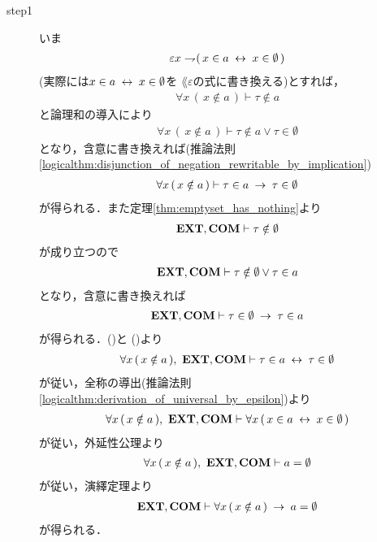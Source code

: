	\begin{prf}\mbox{}
		\begin{description}
			\item[step1]
				いま
				\begin{align}
					\varepsilon x \rightharpoondown\hspace{-0.25em} (\, x \in a \hspace{0.25em}\leftrightarrow\hspace{0.25em} x \in \emptyset\, )
				\end{align}
				(実際には$x \in a \hspace{0.25em}\leftrightarrow\hspace{0.25em} x \in \emptyset$を
				$\lang{\varepsilon}$の式に書き換える)とすれば，
				\begin{align}
					\forall x\, (\, x \notin a\, ) \vdash \tau \notin a
				\end{align}
				と論理和の導入により
				\begin{align}
					\forall x\, (\, x \notin a\, ) \vdash 
					\tau \notin a \vee \tau \in \emptyset
				\end{align}
				となり，含意に書き換えれば(推論法則
				\ref{logicalthm:disjunction_of_negation_rewritable_by_implication})
				\begin{align}
					\forall x\, (\, x \notin a\, ) \vdash 
					\tau \in a \hspace{0.25em}\rightarrow\hspace{0.25em} \tau \in \emptyset
					\label{fom:uniqueness_of_emptyset_1}
				\end{align}
				が得られる．また定理\ref{thm:emptyset_has_nothing}より
				\begin{align}
					\mbox{{\bf EXT}},\mbox{\bf COM} \vdash \tau \notin \emptyset
				\end{align}
				が成り立つので
				\begin{align}
					\mbox{{\bf EXT}},\mbox{\bf COM} \vdash \tau \notin \emptyset \vee \tau \in a
				\end{align}
				となり，含意に書き換えれば
				\begin{align}
					\mbox{{\bf EXT}},\mbox{\bf COM} \vdash \tau \in \emptyset \hspace{0.25em}\rightarrow\hspace{0.25em} \tau \in a
					\label{fom:uniqueness_of_emptyset_2}
				\end{align}
				が得られる．()と
				()より
				\begin{align}
					\forall x\, (\, x \notin a\, ),\ \mbox{{\bf EXT}},\mbox{\bf COM} \vdash
					\tau \in a \hspace{0.25em}\leftrightarrow\hspace{0.25em} \tau \in \emptyset
				\end{align}
				が従い，全称の導出(推論法則\ref{logicalthm:derivation_of_universal_by_epsilon})より
				\begin{align}
					\forall x\, (\, x \notin a\, ),\ \mbox{{\bf EXT}},\mbox{\bf COM} \vdash
					\forall x\, (\, x \in a \hspace{0.25em}\leftrightarrow\hspace{0.25em} x \in \emptyset\, )
				\end{align}
				が従い，外延性公理より
				\begin{align}
					\forall x\, (\, x \notin a\, ),\ \mbox{{\bf EXT}},\mbox{\bf COM} \vdash
					a = \emptyset
				\end{align}
				が従い，演繹定理より
				\begin{align}
					\mbox{{\bf EXT}},\mbox{\bf COM} \vdash
					\forall x\, (\, x \notin a\, ) \hspace{0.25em}\rightarrow\hspace{0.25em} a = \emptyset
				\end{align}
				が得られる．
				

\end{description}
\end{prf}

